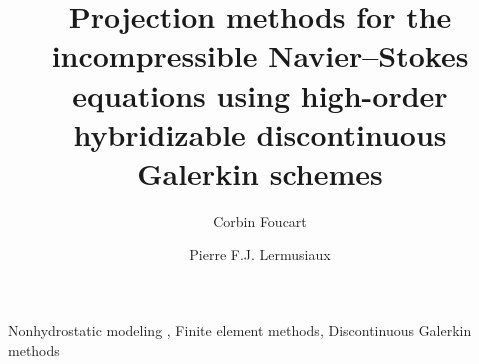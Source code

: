 \documentclass[preprint,10pt,numbers]{elsarticle}
\begin{document}
\begin{frontmatter}



\title{Projection methods for the incompressible Navier--Stokes equations using high-order hybridizable discontinuous Galerkin schemes}%


\author[MechE]{Corbin Foucart}
\author[MechE]{Pierre F.J. Lermusiaux}


\begin{abstract}

\end{abstract}

\begin{keyword}
Nonhydrostatic modeling \sep
Finite element methods\sep
Discontinuous Galerkin methods
\end{keyword}

\end{frontmatter}




\clearpage
\appendix


%

{\footnotesize

}
\end{document}
